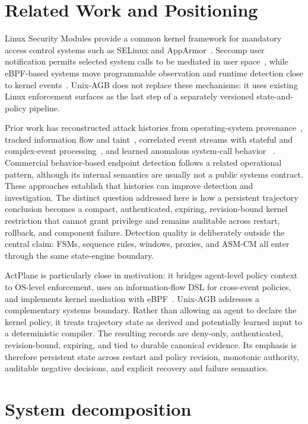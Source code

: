 \documentclass[11pt,a4paper]{article}
\begin{document}
\section{Related Work and Positioning}

Linux Security Modules provide a common kernel framework for mandatory access
control systems such as SELinux and AppArmor~\cite{lsm,selinux,apparmor}.
Seccomp user notification permits selected system calls to be mediated in user
space~\cite{seccomp}, while eBPF-based systems move programmable observation
and runtime detection close to kernel events~\cite{falco}. Unix-AGB does not
replace these mechanisms: it uses existing Linux enforcement surfaces as the
last step of a separately versioned state-and-policy pipeline.

Prior work has reconstructed attack histories from operating-system
provenance~\cite{backtracker,camflow}, tracked information flow and
taint~\cite{denning}, correlated event streams with stateful and complex-event
processing~\cite{cep}, and learned anomalous system-call behavior
~\cite{forrest}. Commercial behavior-based endpoint detection follows a
related operational pattern, although its internal semantics are usually not a
public systems contract. These approaches establish that histories can improve
detection and investigation. The distinct question addressed here is how a
persistent trajectory conclusion becomes a compact, authenticated, expiring,
revision-bound kernel restriction that cannot grant privilege and remains
auditable across restart, rollback, and component failure. Detection quality is
deliberately outside the central claim: FSMs, sequence rules, windows, proxies,
and ASM-CM all enter through the same state-engine boundary.

ActPlane is particularly close in motivation: it bridges agent-level policy
context to OS-level enforcement, uses an information-flow DSL for cross-event
policies, and implements kernel mediation with eBPF~\cite{actplane}. Unix-AGB
addresses a complementary systems boundary. Rather than allowing an agent to
declare the kernel policy, it treats trajectory state as derived and
potentially learned input to a deterministic compiler. The resulting records
are deny-only, authenticated, revision-bound, expiring, and tied to durable
canonical evidence. Its emphasis is therefore persistent state across restart
and policy revision, monotonic authority, auditable negative decisions, and
explicit recovery and failure semantics.

\section{System decomposition}
\end{document}
